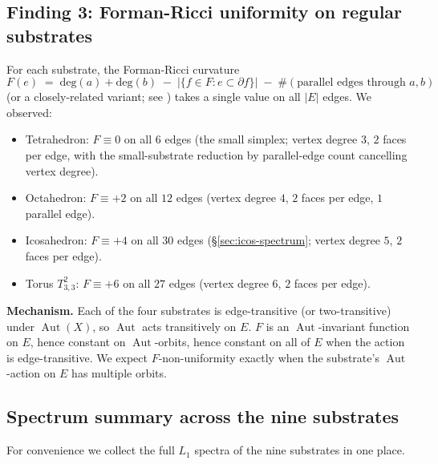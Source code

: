 \documentclass[12pt,a4paper]{article}
\theoremstyle{definition}
\theoremstyle{remark}
\DeclareMathOperator{\Aut}{Aut}
\begin{document}
\subsection{Finding 3: Forman-Ricci uniformity on regular
substrates}\label{sec:dh-cs-forman}

For each substrate, the Forman-Ricci curvature
\[
  F(e) \;=\; \mathrm{deg}(a) + \mathrm{deg}(b)
  \;-\; |\{f \in F : e \subset \partial f\}|
  \;-\; \#(\text{parallel edges through } a, b)
\]
(or a closely-related variant; see \cite{Forman2003}) takes a single value
on all $|E|$ edges. We observed:
\begin{itemize}\setlength{\itemsep}{0pt}
\item Tetrahedron: $F \equiv 0$ on all $6$ edges (the small simplex;
  vertex degree $3$, $2$ faces per edge, with the small-substrate
  reduction by parallel-edge count cancelling vertex degree).
\item Octahedron: $F \equiv +2$ on all $12$ edges (vertex degree $4$,
  $2$ faces per edge, $1$ parallel edge).
\item Icosahedron: $F \equiv +4$ on all $30$ edges
  (\S\ref{sec:icos-spectrum}; vertex degree $5$, $2$ faces per edge).
\item Torus $T^2_{3,3}$: $F \equiv +6$ on all $27$ edges (vertex degree
  $6$, $2$ faces per edge).
\end{itemize}

\textbf{Mechanism.} Each of the four substrates is edge-transitive (or
two-transitive) under $\Aut(X)$, so $\Aut$ acts transitively on $E$.
$F$ is an $\Aut$-invariant function on $E$, hence constant on
$\Aut$-orbits, hence constant on all of $E$ when the action is
edge-transitive. We expect $F$-non-uniformity exactly when the
substrate's $\Aut$-action on $E$ has multiple orbits.

\subsection{Spectrum summary across the nine substrates}\label{sec:dh-cs-spectrum-summary}

For convenience we collect the full $L_1$ spectra of the nine substrates
in one place.
\end{document}

